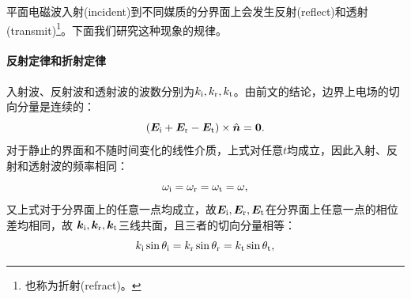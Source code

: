 平面电磁波入射(incident)到不同媒质的分界面上会发生反射(reflect)和透射(transmit)\footnote{也称为折射(refract)。}。下面我们研究这种现象的规律。
\begin{notecaptionblock}
    \label{fig:refraction}
\end{notecaptionblock}

\paragraph{反射定律和折射定律}

入射波、反射波和透射波的波数分别为$k_\mathrm i,k_\mathrm r,k_\mathrm t$。由前文的结论，边界上电场的切向分量是连续的：
\[
    (\bm E_\mathrm i + \bm E_\mathrm r - \bm E_\mathrm t) \times \mathop{}\!\hat{\bm{n}} = \bm 0.
\]
对于静止的界面和不随时间变化的线性介质，上式对任意$t$均成立，因此入射、反射和透射波的频率相同：
\begin{equation}
    \label{eqn:omegai=omegar=omegat}
    \omega_\mathrm i = \omega_\mathrm r = \omega_\mathrm t = \omega,
\end{equation}
又上式对于分界面上的任意一点均成立，故$\bm E_\mathrm i,\bm E_\mathrm r,\bm E_\mathrm t$在分界面上任意一点的相位差均相同，故
$\bm k_\mathrm i,\bm k_\mathrm r,\bm k_\mathrm t$三线共面，且三者的切向分量相等：
\begin{equation}
    k_\mathrm i\sin\theta_\mathrm i = k_\mathrm r\sin\theta_\mathrm r = k_\mathrm t\sin\theta_\mathrm t,
\end{equation}

